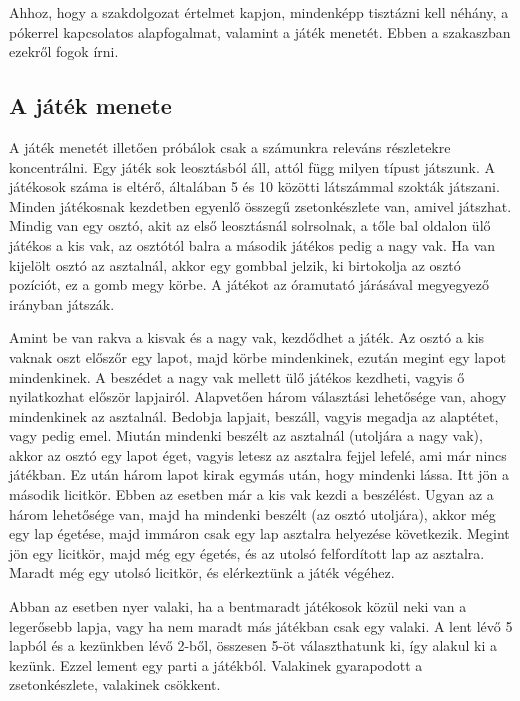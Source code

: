 
Ahhoz, hogy a szakdolgozat értelmet kapjon, mindenképp tisztázni kell néhány, a pókerrel kapcsolatos alapfogalmat, valamint a játék menetét. Ebben a szakaszban ezekről fogok írni.

\subsection{A játék menete}
A játék menetét illetően próbálok csak a számunkra releváns részletekre koncentrálni. Egy játék sok leosztásból áll, attól függ milyen típust játszunk. A játékosok száma is eltérő, általában 5 és 10 közötti látszámmal szokták játszani. Minden játékosnak kezdetben egyenlő összegű zsetonkészlete van, amivel játszhat. Mindig van egy osztó, akit az első leosztásnál solrsolnak, a tőle bal oldalon ülő játékos a kis vak, az osztótól balra a második játékos pedig a nagy vak. Ha van kijelölt osztó az asztalnál, akkor egy gombbal jelzik, ki birtokolja az osztó pozíciót, ez a gomb megy körbe. A játékot az óramutató járásával megyegyező irányban játszák.

Amint be van rakva a kisvak és a nagy vak, kezdődhet a játék. Az osztó a kis vaknak oszt előszőr egy lapot, majd körbe mindenkinek, ezután megint egy lapot mindenkinek. A beszédet a nagy vak mellett ülő játékos kezdheti, vagyis ő nyilatkozhat először lapjairól. Alapvetően három választási lehetősége van, ahogy mindenkinek az asztalnál. Bedobja lapjait, beszáll, vagyis megadja az alaptétet, vagy pedig emel. Miután mindenki beszélt az asztalnál (utoljára a nagy vak), akkor az osztó egy lapot éget, vagyis letesz az asztalra fejjel lefelé, ami már nincs játékban. Ez után három lapot kirak egymás után, hogy mindenki lássa. Itt jön a második licitkör. Ebben az esetben már a kis vak kezdi a beszélést. Ugyan az a három lehetősége van, majd ha mindenki beszélt (az osztó utoljára), akkor még egy lap égetése, majd immáron csak egy lap asztalra helyezése következik. Megint jön egy licitkör, majd még egy égetés, és az utolsó felfordított lap az asztalra. Maradt még egy utolsó licitkör, és elérkeztünk a játék végéhez.

Abban az esetben nyer valaki, ha a bentmaradt játékosok közül neki van a legerősebb lapja, vagy ha nem maradt más játékban csak egy valaki. A lent lévő 5 lapból és a kezünkben lévő 2-ből, összesen 5-öt választhatunk ki, így alakul ki a kezünk. Ezzel lement egy parti a játékból. Valakinek gyarapodott a zsetonkészlete, valakinek csökkent.

